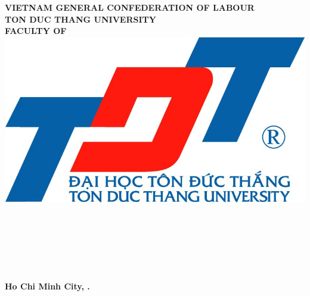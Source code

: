 \begin{center}
	\large{\textbf{VIETNAM GENERAL CONFEDERATION OF LABOUR}} \\
	\large{\textbf{TON DUC THANG UNIVERSITY}} \\
	\large{\textbf{\MakeUppercase{FACULTY OF \khoa}}} \\\vspace*{1cm}	
	\includegraphics[width=0.5\linewidth]{lib/TDTlogo.jpg}\\\vspace*{1cm}	
        \begin{center}
	    \large{\textbf{\tacgia}}\\
	    \large{\textbf{\svba}}\\
	    \large{\textbf{\svhai}}\\
    	\vspace*{3\baselineskip}
        \end{center}	
	\LARGE{\textbf{\MakeUppercase{\doan}}}\vspace*{1.2cm}
        
	\LARGE{\textbf{\MakeUppercase{\de}}}\\
	\Large{\textbf{\MakeUppercase{\monhoc}}}\vspace*{1.2cm}\\
        
	\large{\textbf{Ho Chi Minh City, \nam.}}
\end{center}